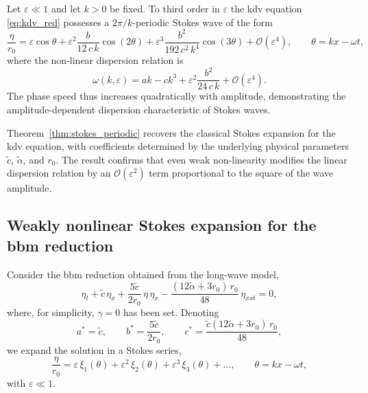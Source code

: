 \documentclass[alpha-refs, 12pt]{wiley-article}
\renewcommand{\O}{\mathcal{O}}
\newcommand{\eps}{\varepsilon}
\begin{document}
\begin{theorem}\label{thm:stokes_periodic}
Let $\eps\ll1$ and let $k>0$ be fixed. To third order in $\eps$ the \acrshort{kdv} equation \eqref{eq:kdv_red} possesses a $2\pi/k$-periodic Stokes wave of the form
\begin{equation}\label{eq:eta_series}
  \frac{\eta}{r_{0}}
  =\eps\cos\theta
  +\eps^{2}\frac{b}{12\,c\,k}\cos(2\theta)
  +\eps^{3}\frac{b^{2}}{192\,c^{2}\,k^{4}}\cos(3\theta)
  +\O(\eps^{4}),
  \qquad
  \theta=kx-\omega t,
\end{equation}
where the non-linear dispersion relation is
\begin{equation}\label{eq:disp_relation}
  \omega(k,\eps)
  =ak-ck^{3}
  +\eps^{2}\frac{b^{2}}{24\,c\,k}
  +\O(\eps^{4}).
\end{equation}
The phase speed thus increases quadratically with amplitude, demonstrating the amplitude-dependent dispersion characteristic of Stokes waves.
\end{theorem}

Theorem~\ref{thm:stokes_periodic} recovers the classical Stokes expansion for the \acrshort{kdv} equation, with coefficients determined by the underlying physical parameters $\tilde{c}$, $\tilde{\alpha}$, and $r_{0}$. The result confirms that even weak non-linearity modifies the linear dispersion relation by an $\O(\eps^{2})$ term proportional to the square of the wave amplitude.

\subsection{Weakly nonlinear Stokes expansion for the \acrshort{bbm} reduction}

Consider the \acrfull{bbm} reduction obtained from the long-wave model,
\begin{equation}\label{eq:BBM}
  \eta_{t}
  +\tilde{c}\,\eta_{x}
  +\frac{5\tilde{c}}{2r_{0}}\,\eta\,\eta_{x}
  -\frac{(12\tilde{\alpha}+3r_{0})\,r_{0}}{48}\,\eta_{xxt}
  =0,
\end{equation}
where, for simplicity, $\gamma = 0$ has been set. Denoting
\[
  a^{\ast}=\tilde{c},\qquad
  b^{\ast}=\frac{5\tilde{c}}{2r_{0}},\qquad
  c^{\ast}=\frac{\tilde{c}(12\tilde{\alpha}+3r_{0})\,r_{0}}{48},
\]
we expand the solution in a Stokes series,
\begin{equation}\label{eq:bbm_ansatz}
  \frac{\eta}{r_{0}}
  =\eps\,\xi_{1}(\theta)
   +\eps^{2}\,\xi_{2}(\theta)
   +\eps^{3}\,\xi_{3}(\theta)
   +\dots,
  \qquad
  \theta=kx-\omega t,
\end{equation}
with $\eps \ll 1$.
\end{document}
